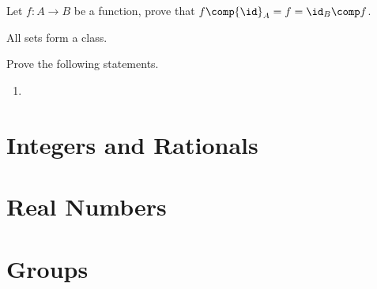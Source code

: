 \documentclass[10pt]{article}
\begin{document}
\begin{problem}
    Let $f:A\to B$ be a function, prove that $f\comp{\id}_{A}=f={\id}_{B}\comp f$.
\end{problem}
\begin{definition}
    
\end{definition}
\begin{example}
    All sets form a class.
\end{example}
\begin{problem}
    Prove the following statements.
    \begin{enumerate}
        \item 
    \end{enumerate}
\end{problem}








\newpage

\section{Integers and Rationals}
\section{Real Numbers}
\section{Groups}

\hindex
\end{document}

